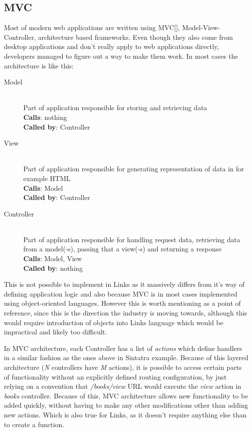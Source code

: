 \subsection{MVC}

Most of modern web applications are written using MVC[], Model-View-Controller, architecture based frameworks. Even though they also come from desktop applications and don't really apply to web applications directly, developers managed to figure out a way to make them work. In most cases the architecture is like this:

\begin{description}
  \item[Model] \hfill \\
  Part of application responsible for storing and retrieving data \\
  \textbf{Calls}: nothing \\
  \textbf{Called by}: Controller
  \item[View] \hfill \\
  Part of application responsible for generating representation of data in for example HTML \\
  \textbf{Calls}: Model \\
  \textbf{Called by}: Controller
  \item[Controller] \hfill \\
  Part of application responsible for handling request data, retrieving data from a model(-s), passing that a view(-s) and returning a response \\
  \textbf{Calls}: Model, View \\
  \textbf{Called by}: nothing
\end{description}

This is not possible to implement in Links as it massively differs from it's way of defining application logic and also because MVC is in most cases implemented using object-oriented languages. However this is worth mentioning as a point of reference, since this is the direction the industry is moving towards, although this would require introduction of objects into Links language which would be impractical and likely too difficult.

In MVC architecture, each Controller has a list of \textit{actions} which define handlers in a similar fashion as the ones above in Sintatra example. Because of this layered architecture (\textit{N} controllers have \textit{M} actions), it is possible to access certain parts of functionality without an explicitly defined routing configuration, by just relying on a convention that \textit{/books/view} URL would execute the \textit{view} action in \textit{books} controller. Because of this, MVC architecture allows new functionality to be added quickly, without having to make any other modifications other than adding new actions. Which is also true for Links, as it doesn't require anything else than to create a function.


